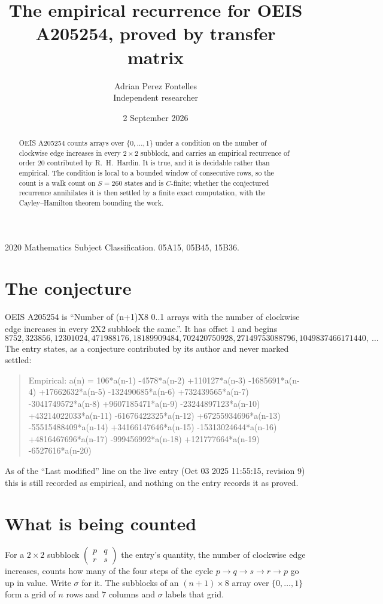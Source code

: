 \documentclass[11pt,a4paper]{article}
\title{The empirical recurrence for OEIS A205254, proved by transfer matrix}
\author{Adrian Perez Fontelles\\ \small Independent researcher}
\date{2 September 2026}
\theoremstyle{plain}
\theoremstyle{definition}
\begin{document}
\maketitle

\begin{abstract}
OEIS A205254 counts arrays over $\{0,\dots,1\}$ under a condition on the number of clockwise edge increases
in every $2\times2$ subblock, and carries an empirical recurrence of order $20$ contributed by
R.~H.~Hardin. It is true, and it is decidable rather than empirical. The condition is local to
a bounded window of consecutive rows, so the count is a walk count on $S=260$ states and is
$C$-finite; whether the conjectured recurrence annihilates it is then settled by a finite exact
computation, with the Cayley--Hamilton theorem bounding the work.
\end{abstract}

\noindent\small 2020 Mathematics Subject Classification. 05A15, 05B45, 15B36.\normalsize

\section{The conjecture}

OEIS A205254 is ``Number of (n+1)X8 0..1 arrays with the number of clockwise edge increases in every 2X2 subblock the same.''. It has offset $1$ and begins
\[
8752, 323856, 12301024, 471988176, 18189909484, 702420750928, 27149753088796, 1049837466171440,\ \dots
\]
The entry states, as a conjecture contributed by its author and never marked settled:
\begin{quote}
Empirical: a(n) = 106*a(n-1) -4578*a(n-2) +110127*a(n-3) -1685691*a(n-4) +17662632*a(n-5) -132490685*a(n-6) +732439565*a(n-7) -3041749572*a(n-8) +9607185471*a(n-9) -23244897123*a(n-10) +43214022033*a(n-11) -61676422325*a(n-12) +67255934696*a(n-13) -55515488409*a(n-14) +34166147646*a(n-15) -15313024644*a(n-16) +4816467696*a(n-17) -999456992*a(n-18) +121777664*a(n-19) -6527616*a(n-20)
\end{quote}
As of the ``Last modified'' line on the live entry (Oct 03 2025 11:55:15, revision 9) this is still
recorded as empirical, and nothing on the entry records it as proved.

\section{What is being counted}

For a $2\times2$ subblock $\begin{pmatrix}p&q\\r&s\end{pmatrix}$ the
entry's quantity, the number of clockwise edge increases, counts how many of the four steps of the cycle $p\to q\to s\to r\to p$ go up in value. Write $\sigma$ for it. The subblocks of an
$(n+1)\times8$ array over $\{0,\dots,1\}$ form a grid of $n$ rows and $7$
columns and $\sigma$ labels that grid.
\end{document}
